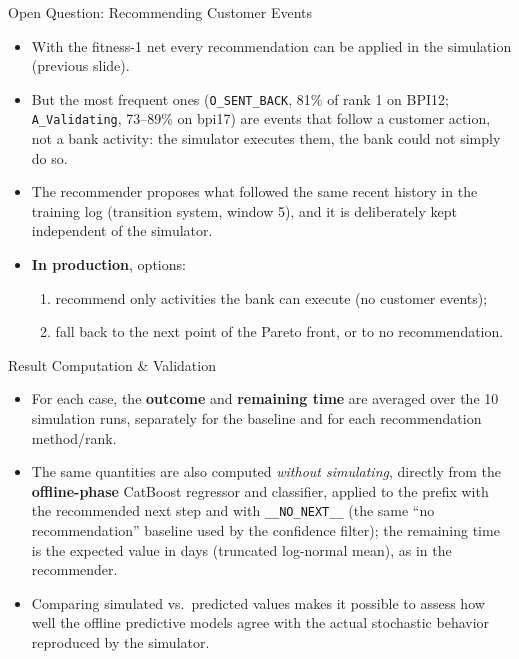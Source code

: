 \documentclass[aspectratio=169]{beamer} %
\begin{document}
\begin{frame}{Open Question: Recommending Customer Events}
  \small
  \begin{itemize}
    \item With the fitness-1 net every recommendation can be applied in the simulation (previous slide).
    \item But the most frequent ones (\texttt{O\_SENT\_BACK}, 81\% of rank 1 on BPI12; \texttt{A\_Validating},
      73--89\% on bpi17) are events that follow a \alert{customer} action, not a bank activity: the simulator
      executes them, the bank could not simply do so.
    \item The recommender proposes what followed the same recent history in the training log (transition
      system, window 5), and it is deliberately kept independent of the simulator.
    \item \textbf{In production}, options:
      \begin{enumerate}
        \item recommend only activities the bank can execute (no customer events);
        \item fall back to the next point of the Pareto front, or to no recommendation.
      \end{enumerate}
  \end{itemize}
\end{frame}

\begin{frame}{Result Computation \& Validation}
    \begin{itemize}
        \item For each case, the \textbf{outcome} and \textbf{remaining time} are averaged over the 10 simulation runs, separately for the baseline and for each recommendation method/rank.
        \item The same quantities are also computed \textit{without simulating}, directly from the \textbf{offline-phase} CatBoost regressor and classifier, applied to the prefix with the recommended next step and with \texttt{\_\_NO\_NEXT\_\_} (the same ``no recommendation'' baseline used by the confidence filter); the remaining time is the expected value in days (truncated log-normal mean), as in the recommender.
        \item Comparing simulated vs.\ predicted values makes it possible to assess how well the offline predictive models agree with the actual stochastic behavior reproduced by the simulator.
    \end{itemize}
\end{frame}
\end{document}
